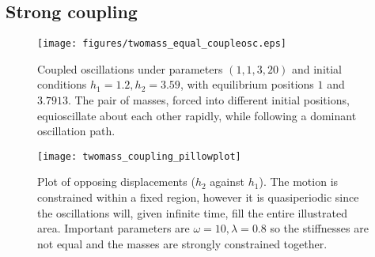 \documentclass{article}
\begin{document}
\subsection{Strong coupling}

\begin{figure}
    \centering
    \texttt{[image: figures/twomass\_equal\_coupleosc.eps]}
    \caption{Coupled oscillations under parameters \((1, 1, 3, 20)\) and initial conditions \(h_1 = 1.2, h_2 = 3.59\),
    with equilibrium positions \(1\) and \(3.7913\). The pair of masses, forced into different initial positions,
    equioscillate about each other rapidly, while following a dominant oscillation path.}
    \label{fig:twomass_dominant_osc}
\end{figure}

\begin{figure}
    \centering
    \texttt{[image: twomass\_coupling\_pillowplot]}
    \caption{
        Plot of opposing displacements ($h_2$ against $h_1$). The motion is constrained within a fixed region,
        however it is quasiperiodic since the oscillations will, given infinite time, fill the entire illustrated area.
        Important parameters are \(\omega = 10, \lambda = 0.8\) so the stiffnesses are not equal and the masses are strongly constrained together.
    }
    \label{fig:twomass_quasiperiodic}
\end{figure} %
\end{document}
